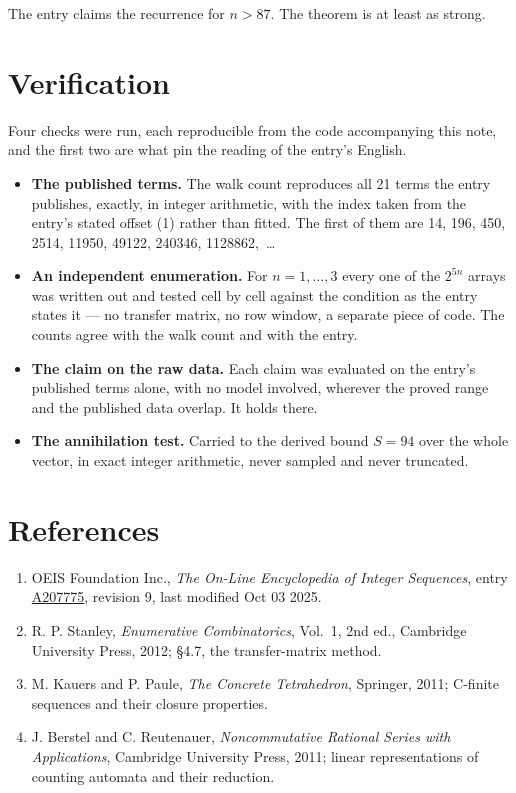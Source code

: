 \documentclass[11pt]{article}
\theoremstyle{definition}
\begin{document}
The entry claims the recurrence for $n > 87$. The theorem is at least as strong.

\section{Verification}

Four checks were run, each reproducible from the code accompanying this note, and the first two are what pin the reading of the entry's English.

\begin{itemize}

\item {\bfseries The published terms.} The walk count reproduces all 21 terms the entry publishes, exactly, in integer arithmetic, with the index taken from the entry's stated offset (1) rather than fitted. The first of them are 14, 196, 450, 2514, 11950, 49122, 240346, 1128862,~\dots

\item {\bfseries An independent enumeration.} For $n = 1,\dots,3$ every one of the $2^{5n}$ arrays was written out and tested cell by cell against the condition as the entry states it --- no transfer matrix, no row window, a separate piece of code. The counts agree with the walk count and with the entry.

\item {\bfseries The claim on the raw data.} Each claim was evaluated on the entry's published terms alone, with no model involved, wherever the proved range and the published data overlap. It holds there.

\item {\bfseries The annihilation test.} Carried to the derived bound $S = 94$ over the whole vector, in exact integer arithmetic, never sampled and never truncated.

\end{itemize}

\section{References}

\begin{enumerate}

\item OEIS Foundation Inc., \emph{The On-Line Encyclopedia of Integer Sequences}, entry \href{https://oeis.org/A207775}{A207775}, revision 9, last modified Oct 03 2025.

\item R. P. Stanley, \emph{Enumerative Combinatorics}, Vol.~1, 2nd ed., Cambridge University Press, 2012; \S4.7, the transfer-matrix method.

\item M. Kauers and P. Paule, \emph{The Concrete Tetrahedron}, Springer, 2011; C-finite sequences and their closure properties.

\item J. Berstel and C. Reutenauer, \emph{Noncommutative Rational Series with Applications}, Cambridge University Press, 2011; linear representations of counting automata and their reduction.

\end{enumerate}
\end{document}
